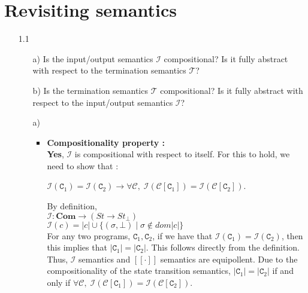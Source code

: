 \documentclass{article}
\newcommand{\C}{\mathtt{C}}
\newcommand{\question}[1]
{\color{DarkBlue}#1 \color{Black}}
\begin{document}

\section{Revisiting semantics}

\begin{enumerate}
\question{
\item[1.1] 
\begin{enumerate}
	\item[a)] Is the input/output semantics $\mathcal{I}$ compositional? Is it
	fully abstract with respect to the termination semantics $\mathcal{T}$?
	\item[b)] Is the termination semantics $\mathcal{T}$ compositional? Is it
	fully abstract with respect to the input/output semantics $\mathcal{I}$?
\end{enumerate}
}

\begin{enumerate}
\item[a)] \begin{itemize}

\item \textbf{Compositionality property :}\\

	\textbf{Yes}, $\mathcal{I}$ is compositional with respect to itself.
	For this to hold, we need to show that :
	
	$\mathcal{I}(\C_1) = \mathcal{I}(\C_2) \rightarrow 
	\forall \mathcal{C}, \;	
	\mathcal{I}(\mathcal{C}[\C_1]) = \mathcal{I}(\mathcal{C}[\C_2])$.
		
	By definition, \\
	
	$\mathcal{I} : \textbf{Com} \rightarrow (St \rightarrow St_{ \bot })$\\
	$ \mathcal{I}(c) = | c | \cup  \{ (\sigma, \bot) \; | \; \sigma
	\notin dom | c | \} $\\
		
	For any two programs, $\C_1,\C_2$, if we have that $\mathcal{I}(\C_1) =
	\mathcal{I}(\C_2)$, 
	then this implies that $|\C_1| = | \C_2|$. This follows directly from the
	definition.	
	Thus, $\mathcal{I}$ semantics and $[[\cdot]]$ semantics are
	equipollent.
	Due to the compositionality of the state transition semantics,
	$|\C_1| = | \C_2|$ if and only if 
	$\forall \mathcal{C}, \; \mathcal{I}(\mathcal{C}[\C_1]) =
	\mathcal{I}(\mathcal{C}[\C_2])$.  \\
	

\end{itemize}
\end{enumerate}
\end{enumerate}
\end{document}
